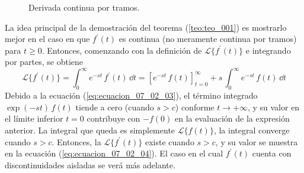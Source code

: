\begin{figure}[H]
    \centering
    
    \caption{Derivada continua por tramos.}
    \label{fig:figura_07_02_01}
\end{figure}
La idea principal de la demostración del teorema (\ref{teo:teo_001}) es mostrarlo mejor en el caso en que $f^{\prime}(t)$ es continua (no meramente continua por tramos) para $t \geq 0$. Entonces, comenzando con la definición de $\mathscr{L} \{ f^{\prime}(t) \} $ e integrando por partes, se obtiene
\[ \mathscr{L} \{f^{\prime}(t) \} = \int_{0}^{\infty} e^{-st} \, f^{\prime}(t) \, \dd t = \left[ e^{-st} \, f(t) \right]_{t=0}^{\infty} + s \, \int_{0}^{\infty} e^{-st} \, f(t) \, \dd t \]
Debido a la ecuación (\ref{eq:ecuacion_07_02_03}), el término integrado $\exp(-st) \, f(t)$ tiende a cero (cuando $s > c$) conforme $t \to +\infty$, y su valor en el límite inferior $t=0$ contribuye con $-f(0)$ en la evaluación de la expresión anterior. La integral que queda es simplemente $\mathscr{L} \{ f(t) \} $, la integral converge cuando $s > c$. Entonces, la $\mathscr{L} \{ f^{\prime}(t) \}$ existe cuando $s > c$, y su valor se muestra en la ecuación (\ref{eq:ecuacion_07_02_04}). El caso en el cual $f^{\prime}(t)$ cuenta con discontinuidades aisladas se verá más adelante.
